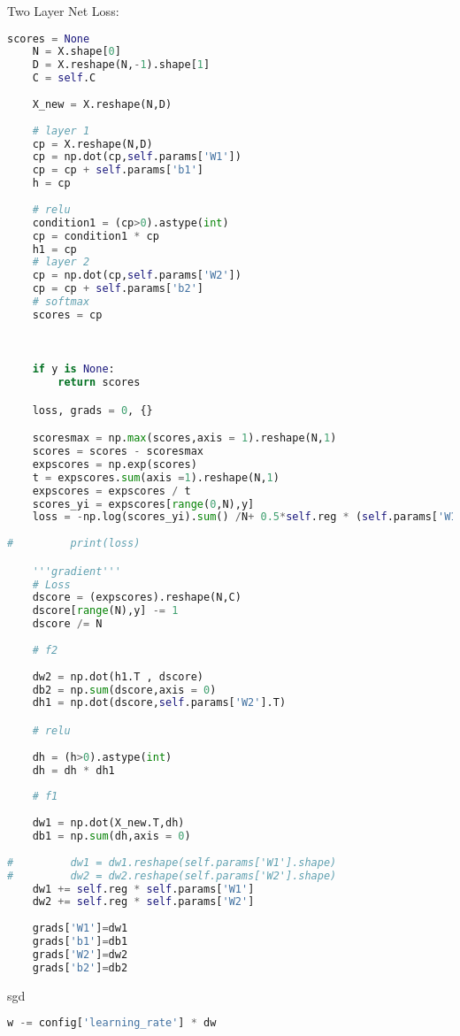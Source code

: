 \documentclass[a4paper]{article}
\begin{document}
Two Layer Net Loss:
\begin{lstlisting}[language=Python, caption=Two Layer Net Loss]
    scores = None
    N = X.shape[0]
    D = X.reshape(N,-1).shape[1]
    C = self.C
    
    X_new = X.reshape(N,D)
    
    # layer 1
    cp = X.reshape(N,D)
    cp = np.dot(cp,self.params['W1'])
    cp = cp + self.params['b1']
    h = cp
    
    # relu
    condition1 = (cp>0).astype(int)
    cp = condition1 * cp
    h1 = cp
    # layer 2
    cp = np.dot(cp,self.params['W2'])
    cp = cp + self.params['b2']
    # softmax
    scores = cp
    
    

    if y is None:
        return scores

    loss, grads = 0, {}

    scoresmax = np.max(scores,axis = 1).reshape(N,1)
    scores = scores - scoresmax
    expscores = np.exp(scores)
    t = expscores.sum(axis =1).reshape(N,1)
    expscores = expscores / t
    scores_yi = expscores[range(0,N),y]
    loss = -np.log(scores_yi).sum() /N+ 0.5*self.reg * (self.params['W1'] *self.params['W1']).sum() + 0.5*self.reg * (self.params['W2'] *self.params['W2']).sum()
    
#         print(loss)

    '''gradient'''
    # Loss
    dscore = (expscores).reshape(N,C)
    dscore[range(N),y] -= 1
    dscore /= N
    
    # f2
    
    dw2 = np.dot(h1.T , dscore)
    db2 = np.sum(dscore,axis = 0)
    dh1 = np.dot(dscore,self.params['W2'].T)

    # relu
    
    dh = (h>0).astype(int)
    dh = dh * dh1
    
    # f1
    
    dw1 = np.dot(X_new.T,dh)
    db1 = np.sum(dh,axis = 0)
    
#         dw1 = dw1.reshape(self.params['W1'].shape)
#         dw2 = dw2.reshape(self.params['W2'].shape)
    dw1 += self.reg * self.params['W1']
    dw2 += self.reg * self.params['W2']
    
    grads['W1']=dw1
    grads['b1']=db1
    grads['W2']=dw2
    grads['b2']=db2
\end{lstlisting}

sgd
\begin{lstlisting}[language=Python, caption=sgd]
    w -= config['learning_rate'] * dw
\end{lstlisting}
\end{document}
